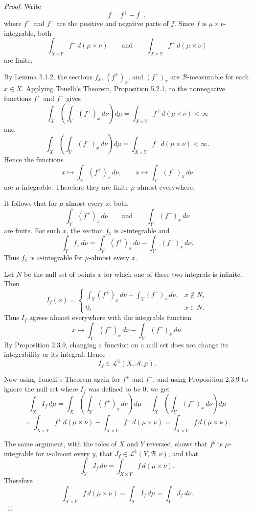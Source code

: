 \documentclass[12pt]{article}
\begin{document}
\begin{proof}
Write
\[
f=f^+-f^-,
\]
where $f^+$ and $f^-$ are the positive and negative parts of $f$. Since $f$ is
$\mu\times\nu$-integrable, both
\[
\int_{X\times Y} f^+\,d(\mu\times\nu)
\qquad\text{and}\qquad
\int_{X\times Y} f^-\,d(\mu\times\nu)
\]
are finite.

By Lemma 5.1.2, the sections $f_x$, $(f^+)_x$, and $(f^-)_x$ are
$\mathcal{B}$-measurable for each $x\in X$. Applying Tonelli's Theorem,
Proposition 5.2.1, to the nonnegative functions $f^+$ and $f^-$ gives
\[
\int_X\left(\int_Y (f^+)_x\,d\nu\right)d\mu
=
\int_{X\times Y} f^+\,d(\mu\times\nu)
<\infty
\]
and
\[
\int_X\left(\int_Y (f^-)_x\,d\nu\right)d\mu
=
\int_{X\times Y} f^-\,d(\mu\times\nu)
<\infty.
\]
Hence the functions
\[
x\mapsto \int_Y (f^+)_x\,d\nu,
\qquad
x\mapsto \int_Y (f^-)_x\,d\nu
\]
are $\mu$-integrable. Therefore they are finite $\mu$-almost everywhere.

It follows that for $\mu$-almost every $x$, both
\[
\int_Y (f^+)_x\,d\nu
\qquad\text{and}\qquad
\int_Y (f^-)_x\,d\nu
\]
are finite. For such $x$, the section $f_x$ is $\nu$-integrable and
\[
\int_Y f_x\,d\nu
=
\int_Y (f^+)_x\,d\nu
-
\int_Y (f^-)_x\,d\nu.
\]
Thus $f_x$ is $\nu$-integrable for $\mu$-almost every $x$.

Let $N$ be the null set of points $x$ for which one of these two integrals is
infinite. Then
\[
I_f(x)=
\begin{cases}
\displaystyle
\int_Y (f^+)_x\,d\nu-\int_Y (f^-)_x\,d\nu,
& x\notin N,\\
0, & x\in N.
\end{cases}
\]
Thus $I_f$ agrees almost everywhere with the integrable function
\[
x\mapsto
\int_Y (f^+)_x\,d\nu-\int_Y (f^-)_x\,d\nu.
\]
By Proposition 2.3.9, changing a function on a null set does not change its
integrability or its integral. Hence
\[
I_f\in \mathcal{L}^1(X,\mathcal{A},\mu).
\]

Now using Tonelli's Theorem again for $f^+$ and $f^-$, and using Proposition
2.3.9 to ignore the null set where $I_f$ was defined to be $0$, we get
\[
\int_X I_f\,d\mu
=
\int_X\left(\int_Y (f^+)_x\,d\nu\right)d\mu
-
\int_X\left(\int_Y (f^-)_x\,d\nu\right)d\mu
\]
\[
=
\int_{X\times Y} f^+\,d(\mu\times\nu)
-
\int_{X\times Y} f^-\,d(\mu\times\nu)
=
\int_{X\times Y} f\,d(\mu\times\nu).
\]

The same argument, with the roles of $X$ and $Y$ reversed, shows that
$f^y$ is $\mu$-integrable for $\nu$-almost every $y$, that
$J_f\in \mathcal{L}^1(Y,\mathcal{B},\nu)$, and that
\[
\int_Y J_f\,d\nu
=
\int_{X\times Y} f\,d(\mu\times\nu).
\]
Therefore
\[
\int_{X\times Y} f\,d(\mu\times\nu)
=
\int_X I_f\,d\mu
=
\int_Y J_f\,d\nu.
\]
\end{proof}
\end{document}

